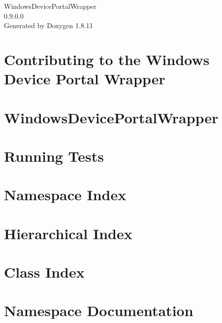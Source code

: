 \documentclass[twoside]{book}
\newcommand{\+}{\discretionary{\mbox{\scriptsize$\hookleftarrow$}}{}{}}
\newcommand{\clearemptydoublepage}{%
  \newpage{\pagestyle{empty}\cleardoublepage}%
}
\begin{document}
\hypersetup{pageanchor=false,
             bookmarksnumbered=true,
             pdfencoding=unicode
            }
\begin{titlepage}
\vspace*{7cm}
\begin{center}%
{\Large Windows\+Device\+Portal\+Wrapper \\[1ex]\large 0.\+9.\+0.\+0 }\\
\vspace*{1cm}
{\large Generated by Doxygen 1.8.11}\\
\end{center}
\end{titlepage}
\clearemptydoublepage
\tableofcontents
\clearemptydoublepage
{}
\hypersetup{pageanchor=true}

\chapter{Contributing to the Windows Device Portal Wrapper}
\label{md_CONTRIBUTING}
\hypertarget{md_CONTRIBUTING}{}

\chapter{Windows\+Device\+Portal\+Wrapper}
\label{md_README}
\hypertarget{md_README}{}

\chapter{Running Tests}
\label{md_Testing}
\hypertarget{md_Testing}{}

\chapter{Namespace Index}

\chapter{Hierarchical Index}

\chapter{Class Index}

\chapter{Namespace Documentation}












\end{document}
